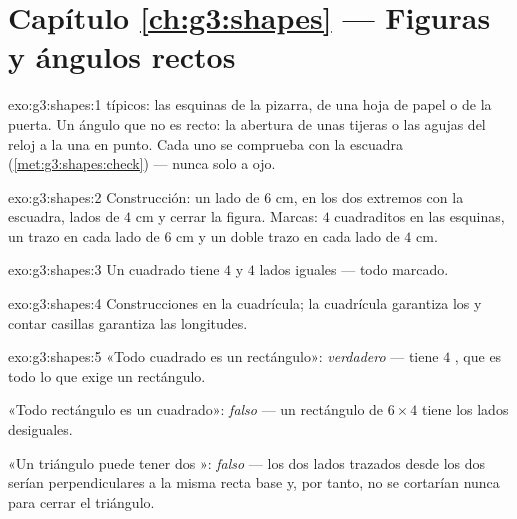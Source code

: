 \section*{Capítulo \ref{ch:g3:shapes} --- Figuras y ángulos rectos}

\begin{solution}{exo:g3:shapes:1}
 típicos: las esquinas de la pizarra, de una hoja de papel
o de la puerta. Un ángulo que no es recto: la abertura de unas tijeras o
las agujas del reloj a la una en punto. Cada uno se comprueba con la
escuadra (\cref{met:g3:shapes:check}) --- nunca solo a ojo.
\end{solution}

\begin{solution}{exo:g3:shapes:2}
Construcción: un lado de $6$ cm,  en los dos extremos con la
escuadra, lados de $4$ cm y cerrar la figura. Marcas: $4$ cuadraditos
en las esquinas, un trazo en cada lado de $6$ cm y un doble trazo
en cada lado de $4$ cm.
\end{solution}

\begin{solution}{exo:g3:shapes:3}
Un cuadrado tiene $4$  y $4$ lados iguales --- todo marcado.
\end{solution}

\begin{solution}{exo:g3:shapes:4}
Construcciones en la cuadrícula; la cuadrícula garantiza los  y
contar casillas garantiza las longitudes.
\end{solution}

\begin{solution}{exo:g3:shapes:5}
«Todo cuadrado es un rectángulo»: \emph{verdadero} --- tiene $4$ , que es todo lo que exige un rectángulo.

«Todo rectángulo es un cuadrado»: \emph{falso} --- un rectángulo de
$6 \times 4$ tiene los lados desiguales.

«Un triángulo puede tener dos »: \emph{falso} --- los dos
lados trazados desde los dos  serían perpendiculares a la
misma recta base y, por tanto, no se cortarían nunca para cerrar el triángulo.
\end{solution}

